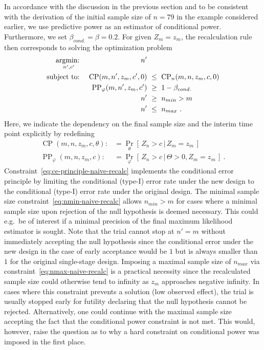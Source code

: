 \documentclass[12pt]{article}
\renewcommand{\Pr}{\operatorname{Pr}}
\newcommand{\st}{\operatorname{subject\ to:\ }}
\newcommand{\argmin}[1]{\operatornamewithlimits{argmin:\ }_{#1}}
\newcommand{\CP}{\ensuremath{\operatorname{CP}}}
\newcommand{\PP}{\ensuremath{\operatorname{PP}}}
\renewcommand{\Pr}{\ensuremath{\operatorname{Pr}}}
\newcommand{\cond}{\ensuremath{\,|\,}}
\begin{document}
In accordance with the discussion in the previous section
and to be consistent with the derivation of the
initial sample size of $n=79$ in the example considered earlier,
we use predictive power as an estimator of conditional power.
Furthermore, we set $\beta_{cond.}=\beta=0.2$.
For given $Z_m = z_m$, the recalculation rule then corresponds to solving
the optimization problem
\begin{align}
    \argmin{n', c'} &&                   n' & \label{eq:naive-recalc}\\
    \st             && \CP(m, n', z_m, c', 0) &\ \leq \ \CP_n(m, n, z_m, c, 0) \label{eq:ce-principle-naive-recalc} \\
                    &&    \PP_\varphi(m, n', z_m, c') &\ \geq \ 1 - \beta_{cond.} \\
                    &&                   n' &\ \geq \ n_{min} > m \label{eq:nmin-naive-recalc} \\
                    &&                   n' &\ \leq \ n_{max} \label{eq:nmax-naive-recalc} \ .
\end{align}
Here, we indicate the dependency on the
final sample size and the interim time point explicitly by redefining
\begin{align}
    \CP(m, n, z_m, c, \theta) :&= \Pr_\theta[\,Z_n > c \cond Z_m = z_m\,] \\
    \PP_\varphi(m, n, z_m, c) :&= \Pr_\varphi[\,Z_n > c \cond \Theta >0, Z_m = z_m\,] \ .
\end{align}
Constraint~\eqref{eq:ce-principle-naive-recalc} implements the conditional
error principle by limiting the conditional (type-I) error rate under the new design to
the conditional (type-I) error rate under the original design.
The minimal sample size constraint~\eqref{eq:nmin-naive-recalc} allows  $n_{min}>m$ for cases where a minimal sample size upon rejection of the null hypothesis is deemed necessary.
This could e.g.~be of interest if a minimal precision of the final maximum likelihood estimator is sought.
Note that the trial cannot stop at $n'=m$ without immediately accepting the
null hypothesis since the conditional error under the new design in the case of early acceptance would be $1$ but is always smaller than $1$ for the original single-stage design.
Imposing a maximal sample size of $n_{max}$ via constraint~\eqref{eq:nmax-naive-recalc} is a practical necessity since the
recalculated sample size could otherwise tend to infinity as $z_m$ approaches negative infinity.
In cases where this constraint prevents a solution (low observed effect),
the trial is usually stopped early for futility declaring that the null hypothesis cannot be rejected.
Alternatively, one could continue with the maximal sample size accepting
the fact that the conditional power constraint is not met.
This would, however, raise the question as to why a hard constraint on conditional power was imposed in the first place.
\end{document}

